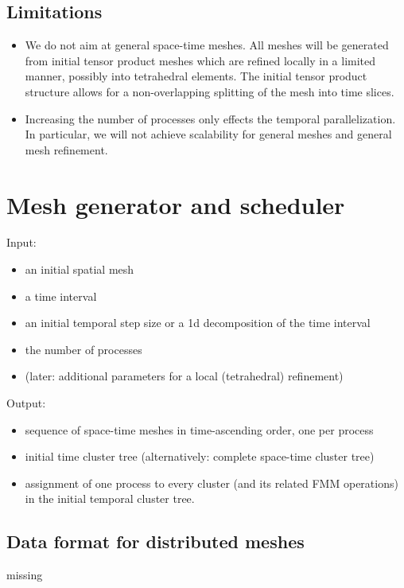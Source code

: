 \documentclass[a4paper,11pt]{article}
\theoremstyle{plain}
\theoremstyle{definition}
\theoremstyle{remark}
\begin{document}
\subsection{Limitations}
\begin{itemize}
  \item  We do not aim at general space-time meshes. All meshes will be generated from initial tensor product meshes which are refined locally in a limited manner, possibly into tetrahedral elements. The initial tensor product structure allows for a non-overlapping splitting of the mesh into time slices.
  \item Increasing the number of processes only effects the temporal parallelization. In particular, we will not 
  achieve scalability for general meshes and general mesh refinement.
\end{itemize}

\section{Mesh generator and scheduler}

Input:
\begin{itemize}
  \item an initial spatial mesh
  \item a time interval
  \item an initial temporal step size or a 1d decomposition of the time interval
  \item the number of processes
  \item (later: additional parameters for a local (tetrahedral) refinement)
\end{itemize}
Output:
\begin{itemize}
  \item sequence of space-time meshes in time-ascending order, one per process
  \item initial time cluster tree (alternatively: complete space-time cluster tree)
  \item assignment of one process to every cluster (and its related FMM operations) in the initial temporal cluster tree.
\end{itemize}

\subsection{Data format for distributed meshes }
missing
\end{document}
